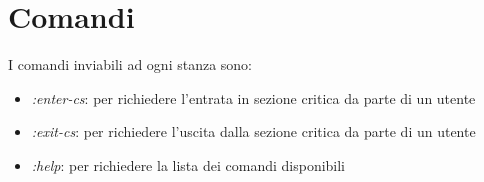 \documentclass[a4paper]{article}
\begin{document}
\newpage

\appendix
\section{Comandi}
I comandi inviabili ad ogni stanza sono:
\begin{itemize}
    \item \textit{:enter-cs}: per richiedere l'entrata in sezione critica da parte di un utente
    \item \textit{:exit-cs}: per richiedere l'uscita dalla sezione critica da parte di un utente
    \item \textit{:help}: per richiedere la lista dei comandi disponibili
\end{itemize}

\end{document}
